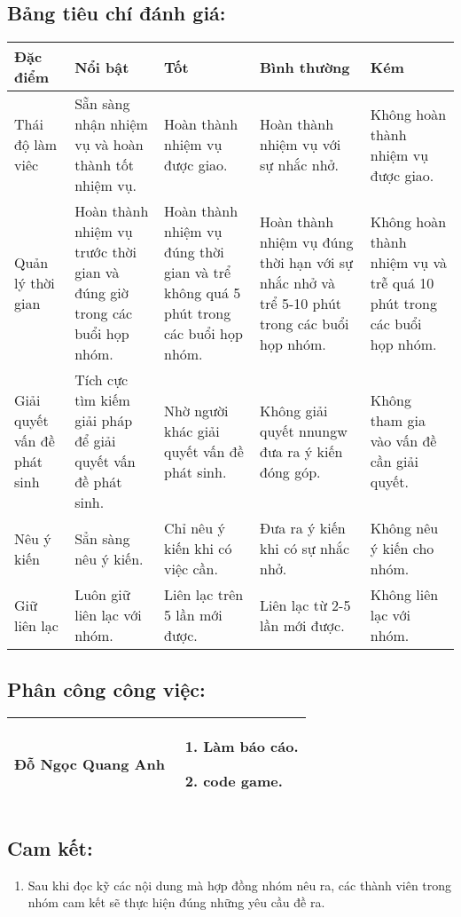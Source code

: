 \documentclass[a4paper,14pt]{extreport}
\begin{document}
\subsection{ Bảng tiêu chí đánh giá:}
\begin{tabular}{| p{2.5cm}| p{3cm} |p{3cm} |p{3cm} |p{3cm}|}
     \hline
    Đặc điểm& Nổi bật& Tốt& Bình thường& Kém \\
    \hline
    Thái độ làm viêc& Sẵn sàng nhận nhiệm vụ và hoàn thành tốt nhiệm vụ.& Hoàn thành nhiệm vụ được giao.& Hoàn thành nhiệm vụ với sự nhắc nhở.& Không hoàn thành nhiệm vụ được giao.\\
    \hline
    Quản lý thời gian& Hoàn thành nhiệm vụ trước thời gian và đúng giờ trong các buổi họp nhóm.& Hoàn thành nhiệm vụ đúng thời gian và trể  không  quá 5 phút trong các buổi họp nhóm.& Hoàn thành nhiệm vụ đúng thời hạn với sự nhắc nhở và trể 5-10 phút trong các buổi họp nhóm.& Không hoàn thành nhiệm vụ và trễ quá 10 phút trong các buổi họp nhóm.\\
    \hline
    Giải quyết vấn đề phát sinh& Tích cực tìm kiếm giải pháp để giải quyết vấn đề phát sinh.& Nhờ người khác giải quyết vấn đề phát sinh.& Không giải quyết nnungw đưa ra ý kiến đóng góp.& Không tham gia vào vấn đề cần giải quyết.\\   
    \hline
    Nêu ý kiến& Sẳn sàng nêu ý kiến.& Chỉ nêu ý  kiến khi có việc cần.& Đưa ra ý kiến khi có sự nhắc nhở.& Không nêu ý kiến cho nhóm.\\
    \hline
    Giữ liên lạc& Luôn giữ liên lạc với nhóm.& Liên lạc trên 5 lần mới được.& Liên lạc từ 2-5 lần mới được.& Không liên lạc với nhóm.\\
    \hline
    
\end{tabular}
\subsection{ Phân công công việc:}
\begin{tabular}{|c | p{10cm}|}
    \hline 
    Đỗ Ngọc Quang Anh& \begin{enumerate}[-]
        \item Làm báo cáo.
        \item code game.
     \end{enumerate}\\
     \hline
\end{tabular}
\subsection{ Cam kết:}
\begin {enumerate}[-]
\item Sau khi đọc kỹ các nội dung mà hợp đồng nhóm nêu ra, các thành viên trong nhóm cam kết sẽ thực hiện đúng những yêu cầu đề ra.

\end{enumerate}
\end{document}
